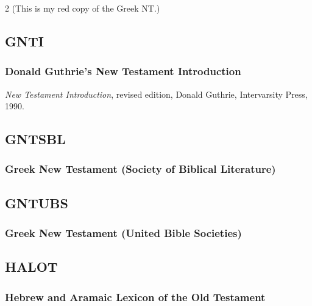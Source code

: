 \begin{multicols}{2}
			(This is my red copy of the Greek NT.)
			
	\subsection*{GNTI}
	
		\subsubsection*{Donald Guthrie's New Testament Introduction}
		
			\textit{New Testament Introduction}, revised edition, Donald Guthrie, Intervarsity Press, 1990.
			
	\subsection*{GNTSBL}
	
		\subsubsection*{Greek New Testament (Society of Biblical Literature)}
		
			\phantom{.}
			
	\subsection*{GNTUBS}
	
		\subsubsection*{Greek New Testament (United Bible Societies)}
		
			\phantom{.}
			
	\subsection*{HALOT}
	
		\subsubsection*{Hebrew and Aramaic Lexicon of the Old Testament}
		

\end{multicols}
